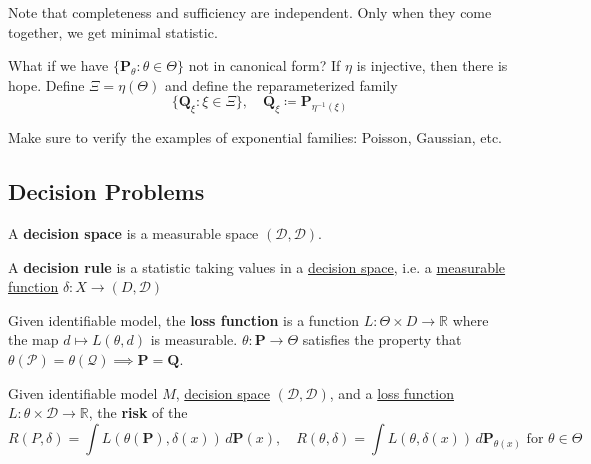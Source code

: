   Note that completeness and sufficiency are independent. Only when they come together, we get minimal statistic. 

  What if we have $\{\mathbf{P}_{\theta} \colon \theta \in \Theta\}$ not in canonical form? If $\eta$ is injective, then there is hope. Define $\Xi = \eta(\Theta)$ and define the reparameterized family 
  \begin{equation}
    \{\mathbf{Q}_\xi \colon \xi \in \Xi \}, \quad \mathbf{Q}_{\xi} \coloneqq \mathbf{P}_{\eta^{-1}(\xi)} 
  \end{equation} 

  \begin{example}
    \label{ex:exponential-families-to-verify}
    Make sure to verify the examples of exponential families: Poisson, Gaussian, etc. 
  \end{example}

\subsection{Decision Problems}

  \begin{definition}
    \label{def:decision-space}
    A \textbf{decision space} is a measurable space $(\mathcal{D}, \mathscr{D})$. 
  \end{definition}

  \begin{definition}
    \label{def:decision-rule}
    A \textbf{decision rule} is a statistic taking values in a \hyperref[def:decision-space]{decision space}, i.e. a \hyperref[mt-def:measurable-function]{measurable function} $\delta : X \to (D, \mathcal{D})$ 
  \end{definition}

  \begin{definition}
    \label{def:loss-function}
    Given identifiable model, the \textbf{loss function} is a function $L: \Theta \times D \to \mathbb{R}$ where the map $d \mapsto L(\theta, d)$ is measurable. 
    $\theta: \mathbf{P} \to \Theta$ satisfies the property that $\theta(\mathcal{P}) = \theta(\mathcal{Q}) \implies \mathbf{P} = \mathbf{Q}$. 
  \end{definition}

  \begin{definition}[Risk]
    \label{def:risk}
    Given identifiable model $M$, \hyperref[def:decision-space]{decision space} $(\mathcal{D}, \mathscr{D})$, and a \hyperref[def:loss-function]{loss function} $L: \theta \times \mathcal{D} \to \mathbb{R}$, the \textbf{risk} of the 
    \begin{equation}
      R(P, \delta) = \int L(\theta(\mathbf{P}), \delta(x)) \, d\mathbf{P}(x), \quad R(\theta, \delta) = \int L(\theta , \delta(x)) \,d\mathbf{P}_{\theta(x)} \text{ for } \theta \in \Theta
    \end{equation}
  \end{definition}

